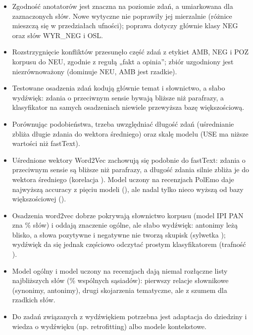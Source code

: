 \documentclass[11pt,a4paper]{article}
\begin{document}
\begin{itemize}
  \item Zgodność anotatorów jest znaczna na poziomie zdań, a umiarkowana dla zaznaczonych słów. Nowe wytyczne nie
        poprawiły jej mierzalnie (różnice mieszczą się w przedziałach ufności); poprawa dotyczy głównie klasy NEG
        oraz słów WYR\_NEG i OSL.
  \item Rozstrzygnięcie konfliktów przesunęło część zdań z etykiet AMB, NEG i POZ korpusu do NEU, zgodnie z regułą
        „fakt a opinia''; zbiór uzgodniony jest niezrównoważony (dominuje NEU, AMB jest rzadkie).
  \item Testowane osadzenia zdań kodują głównie temat i słownictwo, a słabo wydźwięk: zdania o przeciwnym sensie bywają
        bliższe niż parafrazy, a klasyfikator na samych osadzeniach niewiele przewyższa bazę większościową.
  \item Porównując podobieństwa, trzeba uwzględniać długość zdań (uśrednianie zbliża długie zdania do wektora
        średniego) oraz skalę modelu (USE ma niższe wartości niż fastText).
  \item Uśrednione wektory Word2Vec zachowują się podobnie do fastText: zdania o przeciwnym sensie są bliższe niż
        parafrazy, a długość zdania silnie zbliża je do wektora średniego (korelacja \teWSpearmanIpi{}). Model uczony
        na recenzjach PolEmo daje najwyższą accuracy z pięciu modeli (\teWAccPol{}), ale nadal tylko nieco wyższą
        od bazy większościowej (\teWBase{}).
\end{itemize}

\begin{itemize}
  \item Osadzenia word2vec dobrze pokrywają słownictwo korpusu (model IPI PAN zna \weCovTypesIpi\% słów) i oddają
        znaczenie ogólne, ale słabo wydźwięk: antonimy leżą blisko, a słowa pozytywne i negatywne nie tworzą skupisk
        (sylwetka \weSilIpi{}); wydźwięk da się jednak częściowo odczytać prostym klasyfikatorem (trafność \weProbeIpi{}).
  \item Model ogólny i model uczony na recenzjach dają niemal rozłączne listy najbliższych słów (\weOverlap\% wspólnych
        sąsiadów): pierwszy relacje słownikowe (synonimy, antonimy), drugi skojarzenia tematyczne, ale z szumem dla
        rzadkich słów.
  \item Do zadań związanych z wydźwiękiem potrzebna jest adaptacja do dziedziny i wiedza o wydźwięku (np. retrofitting)
        albo modele kontekstowe.
\end{itemize}
\end{document}
